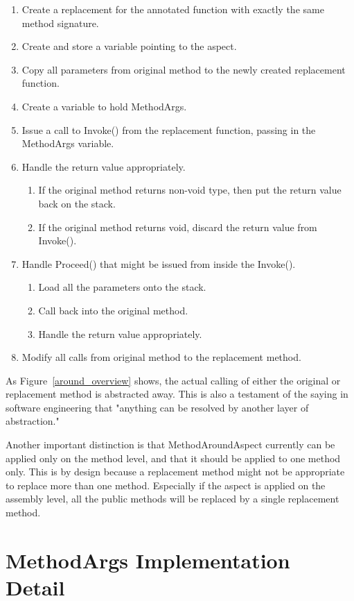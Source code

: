 \begin{enumerate}
	\item Create a replacement for the annotated function with exactly the same method signature.
	\item Create and store a variable pointing to the aspect.
	\item Copy all parameters from original method to the newly created replacement function.
	\item Create a variable to hold MethodArgs.
	\item Issue a call to Invoke() from the replacement function, passing in the MethodArgs variable.
	\item Handle the return value appropriately.
	\begin{enumerate}
		\item If the original method returns non-void type, then put the return value back on the stack.
		\item If the original method returns void, discard the return value from Invoke().
	\end{enumerate}
	\item Handle Proceed() that might be issued from inside the Invoke().
	\begin{enumerate}
		\item Load all the parameters onto the stack.
		\item Call back into the original method.
		\item Handle the return value appropriately.
	\end{enumerate}
	\item Modify all calls from original method to the replacement method.
\end{enumerate}

As Figure~\ref{around_overview} shows, the actual calling of either the original or replacement method is abstracted away. This is also a testament of the saying in software engineering that "anything can be resolved by another layer of abstraction."

Another important distinction is that MethodAroundAspect currently can be applied only on the method level, and that it should be applied to one method only. This is by design because a replacement method might not be appropriate to replace more than one method. Especially if the aspect is applied on the assembly level, all the public methods will be replaced by a single replacement method.

\section{MethodArgs Implementation Detail}

